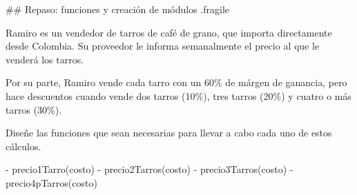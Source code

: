 ## Repaso: funciones y creación de módulos {.fragile}


\bgnblocknormal
\parbox{.96\textwidth}{%
\setlength{\parindent}{2em}
Ramiro es un vendedor de tarros de café de grano, que importa directamente desde Colombia. Su proveedor
le informa semanalmente el precio al que le venderá los tarros.

Por su parte, Ramiro vende cada tarro con un 60\% de márgen de ganancia, pero hace descuentos cuando
vende dos tarros (10\%), tres tarros (20\%) y cuatro o más tarros (30\%).

Diseñe las funciones que sean necesarias para llevar a cabo cada uno de estos cálculos.
}
\trmblocknormal

\pause


- precio1Tarro(costo)
- precio2Tarros(costo)
- precio3Tarros(costo)
- precio4pTarros(costo)

